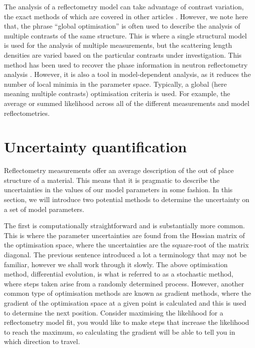 \documentclass[
 reprint,
 superscriptaddress,
 amsmath,amssymb,
 aps,
]{revtex4-1}
\begin{document}
The analysis of a reflectometry model can take advantage of contrast variation, the exact methods of which are covered in other articles \cite{schurtenberger_contrast_2002}.
However, we note here that, the phrase ``global optimisation'' is often used to describe the analysis of multiple contrasts of the same structure.
This is where a single structural model is used for the analysis of multiple measurements, but the scattering length densities are varied based on the particular contrasts under investigation.
This method has been used to recover the phase information in neutron reflectometry analysis \cite{majkrzak_exact_1995,majkrzak_first_2000,majkrzak_phase_2003,koutsioubas_model_2019}.
However, it is also a tool in model-dependent analysis, as it reduces the number of local minimia in the parameter space.
Typically, a global (here meaning multiple contrasts) optimisation criteria is used. For example, the average or summed likelihood across all of the different measurements and model reflectometries.

\section{Uncertainty quantification}
Reflectometry measurements offer an average description of the out of place structure of a material.
This means that it is pragmatic to describe the uncertainties in the values of our model parameters in some fashion.
In this section, we will introduce two potential methods to determine the uncertainty on a set of model parameters.

The first is computationally straightforward and is substantially more common.
This is where the parameter uncertainties are found from the Hessian matrix of the optimisation space, where the uncertainties are the square-root of the matrix diagonal.
The previous sentence introduced a lot a terminology that may not be familiar, however we shall work through it slowly.
The above optimisation method, differential evolution, is what is referred to as a stochastic method, where steps taken arise from a randomly determined process.
However, another common type of optimisation methods are known as gradient methods, where the gradient of the optimisation space at a given point is calculated and this is used to determine the next position.
Consider maximising the likelihood for a reflectometry model fit, you would like to make steps that increase the likelihood to reach the maximum, so calculating the gradient will be able to tell you in which direction to travel.
\end{document}
